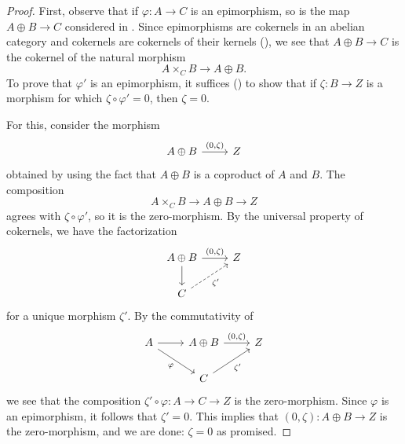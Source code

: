 \begin{proof}
  First, observe that if $\varphi : A \to C$ is an epimorphism, so is
  the map $A \oplus B \to C$ considered in .
  Since epimorphisms are cokernels in an abelian category and
  cokernels are cokernels of their kernels (), we
  see that $A \oplus B \to C$ is the cokernel of the natural morphism
  \[
    A \times_C B \to A \oplus B.
  \]
  To prove that $\varphi'$ is an epimorphism, it suffices
  () to show that if $\zeta : B \to Z$ is a
  morphism for which $\zeta \circ \varphi' = 0$, then $\zeta = 0$.

  For this, consider the morphism
  \[\begin{tikzcd}
      A \oplus B \arrow[r, "{(0,\zeta)}"] & Z
    \end{tikzcd}\] obtained by using the fact that $A \oplus B$ is a
  coproduct of $A$ and $B$. The composition
  \[
    A \times_C B \to A \oplus B \to Z
  \]
  agrees with $\zeta \circ \varphi'$, so it is the zero-morphism. By
  the universal property of cokernels, we have the factorization
  \[\begin{tikzcd}
      A \oplus B \arrow[r, "{(0,\zeta)}"] \arrow[d] & Z \\
      C \arrow[ur, dashed, "\zeta'"']
    \end{tikzcd}\] for a unique morphism $\zeta'$. By the
  commutativity of
  \[\begin{tikzcd}
      A \arrow[r] \arrow[dr, "\varphi"'] &
      A \oplus B \arrow[r, "{(0,\zeta)}"] & Z \\
      & C \arrow[ur, "\zeta'"'] &
    \end{tikzcd}\] we see that the composition
  $\zeta' \circ \varphi : A \to C \to Z$ is the zero-morphism. Since
  $\varphi$ is an epimorphism, it follows that $\zeta' = 0$. This
  implies that $(0,\zeta) : A \oplus B \to Z$ is the zero-morphism,
  and we are done: $\zeta = 0$ as promised.
\end{proof}


